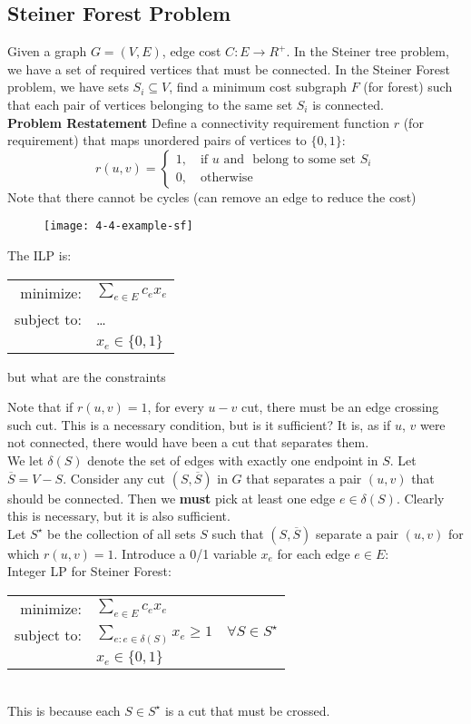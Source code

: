 \documentclass[../main/main.tex]{subfiles}
\begin{document}
\subsection{Steiner Forest Problem}
Given a graph $G=(V,E)$, edge cost $C:E\to R^{+}$. In the Steiner tree problem, we have a set of required vertices that must be connected. In the Steiner Forest problem, we have sets $S_i \subseteq V$, find a minimum cost subgraph $F$ (for forest) such that each pair of vertices belonging to the same set $S_i$ is connected.\\

\textbf{Problem Restatement} Define a connectivity requirement function $r$ (for requirement) that maps unordered pairs of vertices to $\{0,1\}$: \[
	r(u,v) = \begin{cases}
		1,\quad \text{if $u$ and $$ belong to some set $S_i$}\\
		0,\quad \text{otherwise}
\end{cases}
\] Note that there cannot be cycles (can remove an edge to reduce the cost)\\
\begin{figure}[h!]
	\centering
	\texttt{[image: 4-4-example-sf]}
	\label{fig:4-4-example-sf}
\end{figure}
The ILP is: 
\begin{tabular}{rl}
	minimize: &$\sum_{e\in E} c_e x_e$\\
	subject to: & \ldots\\
				&$x_e \in \{0,1\} $
\end{tabular} but what are the constraints

Note that if $r(u,v)=1$, for every $u-v$ cut, there must be an edge crossing such cut. This is a necessary condition, but is it sufficient? It is, as if $u$,  $v$ were not connected, there would have been a cut that separates them.\\

We let  $\delta(S)$ denote the set of edges with exactly one endpoint in $S$. Let $\overline{S}=V-S$. Consider any cut $(S,\overline{S})$ in $G$ that separates a pair $(u,v)$ that should be connected. Then we \textbf{must} pick at least one edge $e\in \delta(S)$. Clearly this is necessary, but it is also sufficient.\\

Let $S^{\star}$ be the collection of all sets $S$ such that $(S,\overline{S})$ separate a pair $(u,v)$ for which $r(u,v)=1$. Introduce a 0/1 variable  $x_e$ for each edge $e\in E$:\\

Integer LP for Steiner Forest:\\

\begin{tabular}{rl}
	minimize: &$\sum_{e\in E} c_e x_e$\\
	subject to: & $\sum_{e:e\in \delta(S)}x_e\ge 1\quad \forall S\in S^{\star}$\\
				&$x_e \in \{0,1\} $
\end{tabular}\\

This is because each $S\in S^{\star}$ is a cut that must be crossed.
\end{document}
